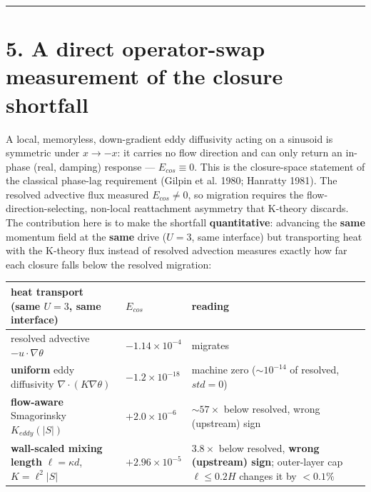 \documentclass[11pt]{article}
\begin{document}
\medskip\hrule\medskip


\section*{5. A direct operator-swap measurement of the closure shortfall}


A local, memoryless, down-gradient eddy diffusivity acting on a sinusoid is symmetric under $x\to -x$: it carries no flow direction and can only return an in-phase (real, damping) response — $E_{cos}\equiv 0$. This is the closure-space statement of the classical phase-lag requirement (Gilpin et al. 1980; Hanratty 1981). The resolved advective flux measured $E_{cos}\ne 0$, so migration requires the flow-direction-selecting, non-local reattachment asymmetry that K-theory discards. The contribution here is to make the shortfall \textbf{quantitative}: advancing the \textbf{same} momentum field at the \textbf{same} drive ($U=3$, same interface) but transporting heat with the K-theory flux instead of resolved advection measures exactly how far each closure falls below the resolved migration:


\begin{center}\small
\begin{tabularx}{\linewidth}{>{\raggedright\arraybackslash}X>{\raggedright\arraybackslash}X>{\raggedright\arraybackslash}X}
\toprule
heat transport (same $U=3$, same interface) & $E_{cos}$ & reading \\
\midrule
resolved advective $-u\cdot \nabla \theta $ & $-1.14\times 10^{-4}$ & migrates \\
\textbf{uniform} eddy diffusivity $\nabla \cdot (K\nabla \theta )$ & $-1.2\times 10^{-18}$ & machine zero ($\sim 10^{-14}$ of resolved, $std=0$) \\
\textbf{flow-aware} Smagorinsky $K_{eddy}(|S|)$ & $+2.0\times 10^{-6}$ & $\sim 57\times $ below resolved, wrong (upstream) sign \\
\textbf{wall-scaled mixing length} $\ell =\kappa d$, $K=\ell ^{2}|S|$ & $+2.96\times 10^{-5}$ & $3.8\times $ below resolved, \textbf{wrong (upstream) sign}; outer-layer cap $\ell \le 0.2H$ changes it by $<0.1\%$ \\
\bottomrule
\end{tabularx}
\end{center}
\end{document}
